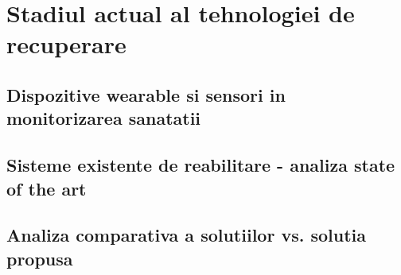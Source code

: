 \chapter{Stadiul actual al tehnologiei de recuperare}
\section{Dispozitive wearable si sensori in monitorizarea sanatatii}
\section{Sisteme existente de reabilitare - analiza state of the art}
\section{Analiza comparativa a solutiilor vs. solutia propusa}
